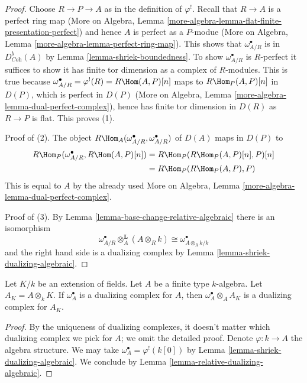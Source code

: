 \begin{proof}
Choose $R \to P \to A$ as in the definition of $\varphi^!$.
Recall that $R \to A$ is a perfect ring map
(More on Algebra, Lemma
\ref{more-algebra-lemma-flat-finite-presentation-perfect}) and
hence $A$ is perfect as a $P$-modue
(More on Algebra, Lemma \ref{more-algebra-lemma-perfect-ring-map}).
This shows that $\omega_{A/R}^\bullet$ is in $D^b_{\textit{Coh}}(A)$
by Lemma \ref{lemma-shriek-boundedness}.
To show $\omega_{A/R}^\bullet$ is $R$-perfect it suffices to
show it has finite tor dimension as a complex of $R$-modules.
This is true because
$\omega_{A/R}^\bullet = \varphi^!(R) = R\Hom(A, P)[n]$
maps to $R\Hom_P(A, P)[n]$ in $D(P)$, which is perfect in $D(P)$
(More on Algebra, Lemma \ref{more-algebra-lemma-dual-perfect-complex}),
hence has finite tor dimension in $D(R)$
as $R \to P$ is flat. This proves (1).

\medskip\noindent
Proof of (2). The object
$R\Hom_A(\omega_{A/R}^\bullet, \omega_{A/R}^\bullet)$
of $D(A)$ maps in $D(P)$ to
\begin{align*}
R\Hom_P(\omega_{A/R}^\bullet, R\Hom(A, P)[n])
& =
R\Hom_P(R\Hom_P(A, P)[n], P)[n] \\
& =
R\Hom_P(R\Hom_P(A, P), P)
\end{align*}
This is equal to $A$ by the already used
More on Algebra, Lemma \ref{more-algebra-lemma-dual-perfect-complex}.

\medskip\noindent
Proof of (3). By Lemma \ref{lemma-base-change-relative-algebraic}
there is an isomorphism
$$
\omega_{A/R}^\bullet \otimes_A^\mathbf{L} (A \otimes_R k) \cong
\omega^\bullet_{A \otimes_R k/k}
$$
and the right hand side is a dualizing complex by
Lemma \ref{lemma-shriek-dualizing-algebraic}.
\end{proof}

\begin{lemma}
\label{lemma-base-change-dualizing-over-field}
Let $K/k$ be an extension of fields. Let $A$ be a finite type
$k$-algebra. Let $A_K = A \otimes_k K$. If
$\omega_A^\bullet$ is a dualizing complex for $A$, then
$\omega_A^\bullet \otimes_A A_K$ is a dualizing complex for $A_K$.
\end{lemma}

\begin{proof}
By the uniqueness of dualizing complexes, it doesn't matter which
dualizing complex we pick for $A$; we omit the detailed proof.
Denote $\varphi : k \to A$ the algebra structure.
We may take $\omega_A^\bullet = \varphi^!(k[0])$ by
Lemma \ref{lemma-shriek-dualizing-algebraic}.
We conclude by
Lemma \ref{lemma-relative-dualizing-algebraic}.
\end{proof}














